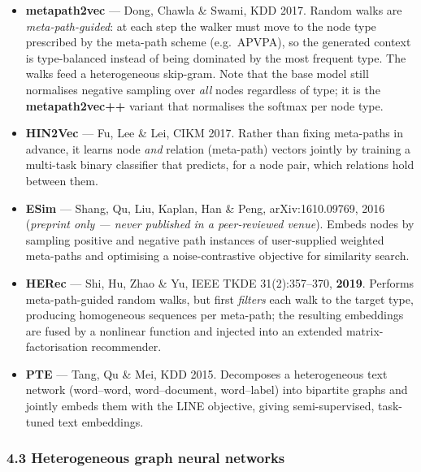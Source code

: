 \begin{itemize}\itemsep3pt
\item \textbf{metapath2vec} --- Dong, Chawla \& Swami, KDD 2017. Random walks are
  \emph{meta-path-guided}: at each step the walker must move to the node type prescribed by the
  meta-path scheme (e.g.\ APVPA), so the generated context is type-balanced instead of being
  dominated by the most frequent type. The walks feed a heterogeneous skip-gram. Note that the
  base model still normalises negative sampling over \emph{all} nodes regardless of type; it is the
  \textbf{metapath2vec++} variant that normalises the softmax per node type.
\item \textbf{HIN2Vec} --- Fu, Lee \& Lei, CIKM 2017. Rather than fixing meta-paths in advance, it
  learns node \emph{and} relation (meta-path) vectors jointly by training a multi-task binary
  classifier that predicts, for a node pair, which relations hold between them.
\item \textbf{ESim} --- Shang, Qu, Liu, Kaplan, Han \& Peng, arXiv:1610.09769, 2016
  (\emph{preprint only --- never published in a peer-reviewed venue}). Embeds nodes by sampling
  positive and negative path instances of user-supplied weighted meta-paths and optimising a
  noise-contrastive objective for similarity search.
\item \textbf{HERec} --- Shi, Hu, Zhao \& Yu, IEEE TKDE 31(2):357--370, \textbf{2019}. Performs
  meta-path-guided random walks, but first \emph{filters} each walk to the target type, producing
  homogeneous sequences per meta-path; the resulting embeddings are fused by a nonlinear function
  and injected into an extended matrix-factorisation recommender.
\item \textbf{PTE} --- Tang, Qu \& Mei, KDD 2015. Decomposes a heterogeneous text network
  (word--word, word--document, word--label) into bipartite graphs and jointly embeds them with the
  LINE objective, giving semi-supervised, task-tuned text embeddings.
\end{itemize}

\subsubsection*{4.3 Heterogeneous graph neural networks}

